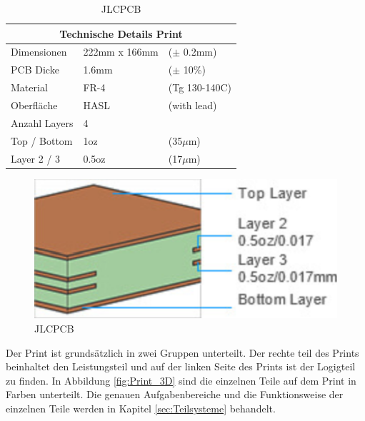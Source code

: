 \begin{table}[H]%
\centering
\parbox{0.5\textwidth}{
\begin{footnotesize}
\begin{tabular}{|l|ll|}
\hline
\multicolumn{3}{|c|}{\textbf{Technische Details Print}}\\
\hline
Dimensionen & 222mm x 166mm & ($\pm$ 0.2mm)\\
\hline
PCB Dicke & 1.6mm & ($\pm$ 10\%)\\
\hline
Material & FR-4 & (Tg 130-140C)\\
\hline
Oberfläche & HASL & (with lead)\\
\hline
Anzahl Layers & 4 & \\
\hline
Top / Bottom & 1oz & (35$\mu$m)\\
\hline
Layer 2 / 3 & 0.5oz & (17$\mu$m)\\
\hline
\end{tabular}
\end{footnotesize}
\caption{JLCPCB \cite{jlcpcb_jlcpcb_2020}}
\label{tab:table}
}
\qquad
\begin{minipage}[c]{0.43\textwidth}%
\centering
\begin{figure}[H]
    \includegraphics[width=1\textwidth]{graphics/Print_Layers}
\caption{JLCPCB \cite{jlcpcb_jlcpcb_2020}}
\label{fig:figure}
\end{figure}
\end{minipage}
\end{table}



\newpage

Der Print ist grundsätzlich in zwei Gruppen unterteilt. Der rechte teil des Prints beinhaltet den Leistungsteil und auf der linken Seite des Prints ist der Logigteil zu finden. In Abbildung \ref{fig:Print_3D} sind die einzelnen Teile auf dem Print in Farben unterteilt. Die genauen Aufgabenbereiche und die Funktionsweise der einzelnen Teile werden in Kapitel \ref{sec:Teilsysteme} behandelt.\\

